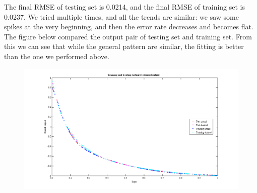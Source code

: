 \documentclass[epsfig]{article}
\def\bpar{\vskip26pt}
\def\npar{\vskip13pt}
\def\spar{\vskip10pt}
\begin{document}
The final RMSE of testing set is 0.0214, and the final RMSE of training set is 0.0237. We tried multiple times, and all the trends are similar: we saw some spikes at the very beginning, and then the error rate decreases and becomes flat.
\spar
The figure below compared the output pair of testing set and training set. From this we can see that while the general pattern are similar, the fitting is better than the one we performed above.
\begin{figure}[!htb] 
\centering\includegraphics[width=6in]{fig6.png} 
\end{figure} 
 
% 
 
\end{document}
